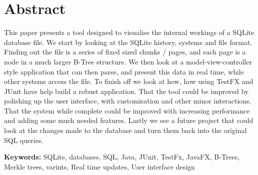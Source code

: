 \section*{\centering Abstract}

This paper presents a tool designed to visualise the internal workings of a SQLite database file. We start by looking at the SQLite history, systems and file format. Finding out the file is a series of fixed sized chunks / pages, and each page is a node in a much larger B-Tree structure. We then look at a model-view-controller style application that can then parse, and present this data in real time, while other systems access the file. To finish off we look at how, how using TestFX and JUnit have help build a robust application. That the tool could be improved by polishing up the user interface, with customisation and other minor interactions. That the system while complete could be improved with increasing performance and adding some much needed features. Lastly we see a future project that could look at the changes made to the database and turn them back into the original SQL queries. 

\vspace{1.5cm}

\textbf{Keywords:} SQLite, databases, SQL, Java, JUnit, TestFx, JavaFX, B-Trees, Merkle trees, varints, Real time updates, User interface design